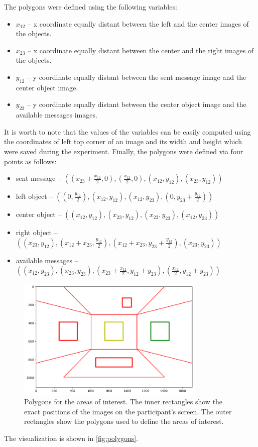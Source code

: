 The polygons were defined using the following variables: 
\begin{itemize}
    \item $x_{12}$ -- x coordinate equally distant between the left and the center images of the objects.
    \item $x_{23}$ -- x coordinate equally distant between the center and the right images of the objects.
    \item $y_{12}$ -- y coordinate equally distant between the sent message image and the center object image.
    \item $y_{23}$ -- y coordinate equally distant between the center object image and the available messages images.
\end{itemize}
It is worth to note that the values of the variables can be easily computed using the coordinates of left top corner of an image and its width and height which were saved during the experiment. Finally, the polygons were defined via four points as follows:
\begin{itemize}
    \item sent message -- $((x_{23}+\frac{x_{12}}{2}, 0), (\frac{x_{12}}{2}, 0), (x_{12}, y_{12}), (x_{23}, y_{12}))$
    \item left object  -- $((0, \frac{y_{12}}{2}), (x_{12}, y_{12}), (x_{12}, y_{23}), (0, y_{23}+\frac{y_{12}}{2}))$
    \item center object -- $((x_{12}, y_{12}), (x_{23}, y_{12}), (x_{23}, y_{23}), (x_{12}, y_{23}))$
    \item right object -- $((x_{23}, y_{12}), (x_{12}+x_{23}, \frac{y_{12}}{2}), (x_{12}+x_{23}, y_{23}+\frac{y_{12}}{2}), (x_{23}, y_{23}))$
    \item available messages -- $((x_{12}, y_{23}), (x_{23}, y_{23}), (x_{23}+\frac{x_{12}}{2}, y_{12}+y_{23}), (\frac{x_{12}}{2}, y_{12}+y_{23}))$
\end{itemize}
\begin{figure}
    \centering
    \includegraphics[width=0.8\textwidth]{images/polygons.png}
    \caption{Polygons for the areas of interest. The inner rectangles show the exact positions of the images on the participant's screen. The outer rectangles show the polygons used to define the areas of interest.}
    \label{fig:polygons}
\end{figure}
The visualization is shown in \autoref{fig:polygons}. 

